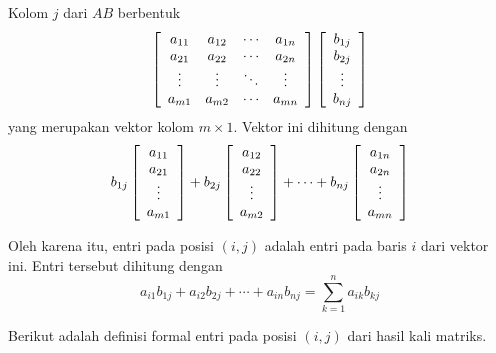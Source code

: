 Kolom $j$ dari $AB$ berbentuk
\begin{equation*}
\left[
\begin{array}{cccc}
a_{11} & a_{12} & \cdots & a_{1n} \\
a_{21} & a_{22} & \cdots & a_{2n} \\
\vdots & \vdots & \ddots & \vdots \\
a_{m1} & a_{m2} & \cdots & a_{mn}
\end{array}
\right] \left[
\begin{array}{c}
b_{1j} \\
b_{2j} \\
\vdots \\
b_{nj}
\end{array}
\right]
\end{equation*}
yang merupakan vektor kolom $m\times 1$. Vektor ini dihitung dengan
\begin{equation*}
b_{1j}
\left[
\begin{array}{c}
a_{11} \\
a_{21} \\
\vdots \\
a_{m1}
\end{array}
\right] + b_{2j}\left[
\begin{array}{c}
a_{12} \\
a_{22} \\
\vdots \\
a_{m2}
\end{array}
\right] +\cdots + b_{nj}\left[
\begin{array}{c}
a_{1n} \\
a_{2n} \\
\vdots \\
a_{mn}
\end{array}
\right] 
\end{equation*}

Oleh karena itu, entri pada posisi $(i,j)$ adalah entri pada baris $i$ dari vektor ini.
Entri tersebut dihitung dengan
\begin{equation*}
a_{i1}b_{1j}+a_{i2}b_{2j}+\cdots + a_{in}b_{nj}=\sum_{k=1}^{n}a_{ik}b_{kj}
\end{equation*}

Berikut adalah definisi formal entri pada posisi $(i,j)$ dari hasil kali matriks. 

